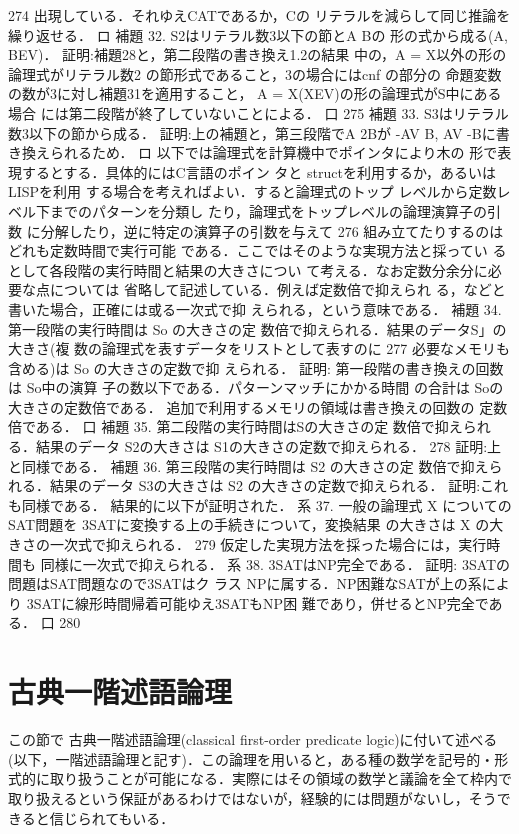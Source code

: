 \documentclass{ltjsarticle}
\theoremstyle{mystyle1}
\theoremstyle{mystyle3}
\theoremstyle{mystyle2}
\newcommand{\red}[1]{{\color{red} #1}}
\begin{document}
274
出現している．それゆえCATであるか，Cの リテラルを減らして同じ推論を繰り返せる． ロ
補題 32. S2はリテラル数3以下の節とA Bの 形の式から成る(A, BEV)．
証明:補題28と，第二段階の書き換え1.2の結果 中の，A = X以外の形の論理式がリテラル数2 の節形式であること，3の場合にはcnf の部分の 命題変数の数が3に対し補題31を適用すること， A = X(XEV)の形の論理式がS中にある場合 には第二段階が終了していないことによる． 口
275
補題 33. S3はリテラル数3以下の節から成る．
証明:上の補題と，第三段階でA 2Bが -AV B, AV -Bに書き換えられるため．
ロ
以下では論理式を計算機中でポインタにより木の 形で表現するとする．具体的にはC言語のポイン タと structを利用するか，あるいはLISPを利用 する場合を考えればよい．すると論理式のトップ レベルから定数レベル下までのパターンを分類し たり，論理式をトップレベルの論理演算子の引数 に分解したり，逆に特定の演算子の引数を与えて
276
組み立てたりするのはどれも定数時間で実行可能 である．ここではそのような実現方法と採ってい るとして各段階の実行時間と結果の大きさについ て考える．なお定数分余分に必要な点については 省略して記述している．例えば定数倍で抑えられ る，などと書いた場合，正確には或る一次式で抑 えられる，という意味である．
補題 34. 第一段階の実行時間は So の大きさの定 数倍で抑えられる．結果のデータS」の大きさ(複 数の論理式を表すデータをリストとして表すのに
277
必要なメモリも含める)は So の大きさの定数で抑 えられる．
証明: 第一段階の書き換えの回数は So中の演算 子の数以下である．パターンマッチにかかる時間 の合計は Soの大きさの定数倍である． 追加で利用するメモリの領域は書き換えの回数の 定数倍である．
口
補題 35. 第二段階の実行時間はSの大きさの定 数倍で抑えられる．結果のデータ S2の大きさは S1の大きさの定数で抑えられる．
278
証明:上と同様である．
補題 36. 第三段階の実行時間は S2 の大きさの定 数倍で抑えられる．結果のデータ S3の大きさは S2 の大きさの定数で抑えられる．
証明:これも同様である．
結果的に以下が証明された．
系 37. 一般の論理式 X についてのSAT問題を 3SATに変換する上の手続きについて，変換結果 の大きさは X の大きさの一次式で抑えられる．
279
仮定した実現方法を採った場合には，実行時間も 同様に一次式で抑えられる．
系 38. 3SATはNP完全である．
証明: 3SATの問題はSAT問題なので3SATはク ラス NPに属する．NP困難なSATが上の系によ り 3SATに線形時間帰着可能ゆえ3SATもNP困 難であり，併せるとNP完全である．
口
280


\section{古典一階述語論理}
この節で\red{古典一階述語論理}(classical first-order predicate logic)に付いて述べる(以下，一階述語論理と記す)．この論理を用いると，ある種の数学を記号的・形式的に取り扱うことが可能になる．実際にはその領域の数学と議論を全て枠内で取り扱えるという保証があるわけではないが，経験的には問題がないし，そうできると信じられてもいる．
\end{document}

